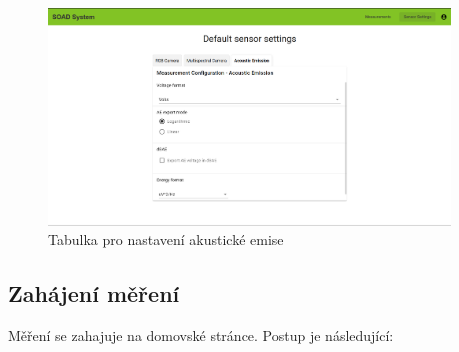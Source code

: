 \documentclass[12pt]{article}
\begin{document}
\begin{teamwork}
        \begin{figure}[hbt!]
            \centering
            \includegraphics[width=0.95\textwidth]{../../img/ae_settings}
            \caption{Tabulka pro nastavení akustické emise}
            \label{fig:ae_settings}
        \end{figure}

        \subsection{Zahájení měření}\label{subsec:zahajeni-mereni}

        Měření se zahajuje na domovské stránce.
        Postup je následující:


\end{teamwork}
\end{document}
